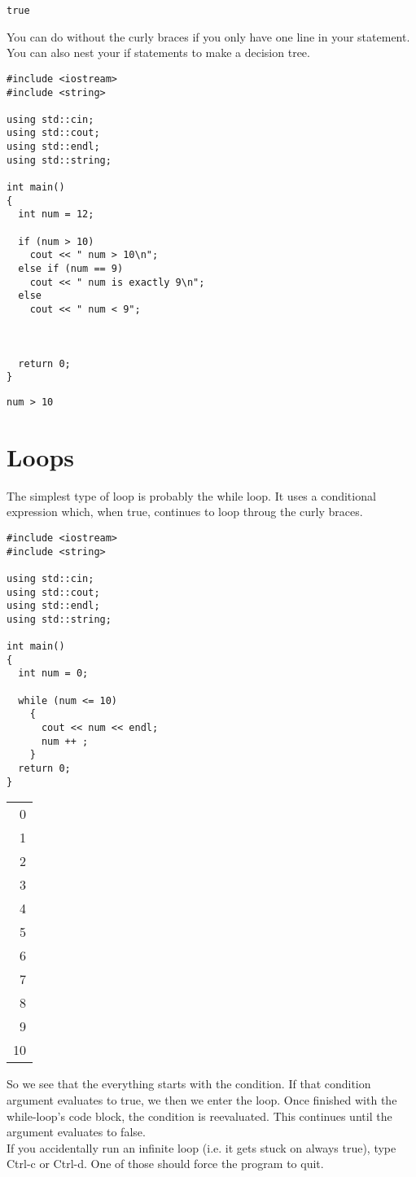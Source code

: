 \documentclass[11pt]{article}
\begin{document}
\begin{verbatim}
true
\end{verbatim}

You can do without the curly braces if you only have one line in
your statement. You can also nest your if statements to make a
decision tree.
\begin{verbatim}
#include <iostream>
#include <string>

using std::cin;
using std::cout;
using std::endl;
using std::string;

int main()
{
  int num = 12;

  if (num > 10)
    cout << " num > 10\n";
  else if (num == 9)
    cout << " num is exactly 9\n";
  else
    cout << " num < 9";



  return 0;
}
\end{verbatim}

\begin{verbatim}
num > 10
\end{verbatim}

\section{Loops}
\label{sec-3}
The simplest type of loop is probably the while loop. It uses a
conditional expression which, when true, continues to loop throug
the curly braces. \\

\begin{verbatim}
#include <iostream>
#include <string>

using std::cin;
using std::cout;
using std::endl;
using std::string;

int main()
{
  int num = 0;

  while (num <= 10)
    {
      cout << num << endl;
      num ++ ;
    }
  return 0;
}
\end{verbatim}

\begin{center}
\begin{tabular}{r}
0\\
1\\
2\\
3\\
4\\
5\\
6\\
7\\
8\\
9\\
10\\
\end{tabular}
\end{center}
So we see that the everything starts with the condition. If that
condition argument evaluates to true, we then we enter the
loop. Once finished with the while-loop's code block, the condition
is reevaluated. This continues until the argument evaluates to
false. \\

If you accidentally run an infinite loop (i.e. it gets stuck on
always true), type Ctrl-c or Ctrl-d. One of those should force the
program to quit.
\end{document}

